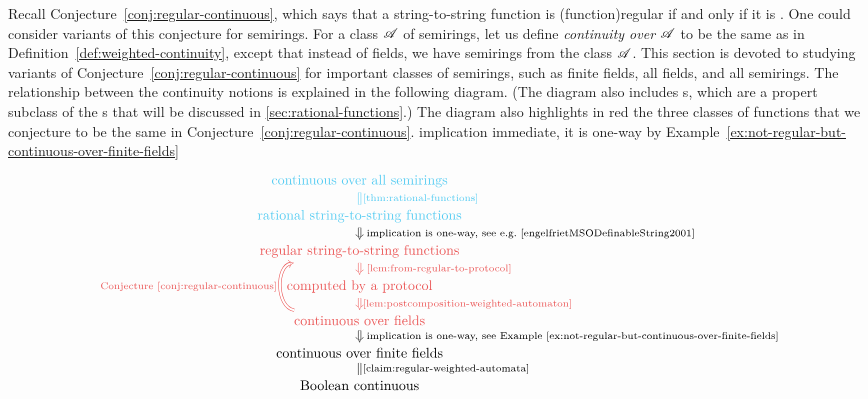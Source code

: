   Recall Conjecture~\ref{conj:regular-continuous}, which says that a string-to-string function is \kl(function){regular} if and only if it is . One could consider variants of this conjecture for semirings.  For a class $\mathscr A$ of semirings, let us define \emph{continuity over $\mathscr A$} to be the same as in Definition~\ref{def:weighted-continuity}, except that instead of fields, we have semirings from the class $\mathscr A$. This section is devoted to studying   variants of Conjecture~\ref{conj:regular-continuous} for  important classes of semirings, such as finite fields, all fields,  and all semirings. The relationship between the continuity notions is explained in the following diagram. (The diagram also includes s, which are a propert subclass of the s that will be discussed in \cref{sec:rational-functions}.) The diagram also highlights in red the three classes of functions that we conjecture to be the same in Conjecture~\ref{conj:regular-continuous}.
implication immediate, it is one-way by Example~\ref{ex:not-regular-but-continuous-over-finite-fields}
\[
\begin{tikzcd}[row sep=small]
 \text{\blue{continuous over all semirings}}
\arrow[d,blue, equal,"\text{\cref{thm:rational-functions}}"]
\\
 \text{\blue{rational string-to-string functions}}
\ar[d,Rightarrow,"\text{ implication is one-way,  see e.g.~\cite[p. 218]{engelfrietMSODefinableString2001}}"]
\\
 \text{\red{regular string-to-string functions}}
\ar[d,red,Rightarrow,"\text{ \cref{lem:from-regular-to-protocol}}"]
\\
% 
 \text{\red{computed by a protocol}}
\ar[d,red,Rightarrow,"\text{\cref{lem:postcomposition-weighted-automaton}}"]
\\
 \text{\red{continuous over fields}}
\ar[uu, red, bend left=80,Rightarrow,"\text{ Conjecture~\ref{conj:regular-continuous}}"]
\ar[d,Rightarrow,"\text{ implication is one-way, see Example~\ref{ex:not-regular-but-continuous-over-finite-fields}}"]
\\
 \text{continuous over finite fields}
\arrow[d,equal,"\text{\cref{claim:regular-weighted-automata}}"]
\\
 \text{Boolean continuous}
\end{tikzcd}
\]


